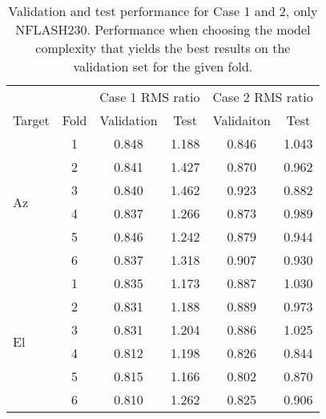 \begin{table}
    \centering
    \caption{Validation and test performance for Case 1 and 2, only NFLASH230.
    Performance when choosing the model complexity that yields the best results on the validation set for the given fold.}
    \begin{tabular}{lccccc}
        \toprule
        & & \multicolumn{2}{c}{Case 1 RMS ratio} & \multicolumn{2}{c}{Case 2 RMS ratio} \\
        \cmidrule{3-4} \cmidrule{5-6}
        Target & Fold & Validation & Test &  Validaiton &  Test \\
        \midrule
        \multirow{6}{*}{Az} & 1 &  0.848 &       1.188 &      0.846 &       1.043 \\
                            & 2 &  0.841 &       1.427 &      0.870 &       0.962 \\
                            & 3 &  0.840 &       1.462 &      0.923 &       0.882 \\
                            & 4 &  0.837 &       1.266 &      0.873 &       0.989 \\
                            & 5 &  0.846 &       1.242 &      0.879 &       0.944 \\
                            & 6 &  0.837 &       1.318 &      0.907 &       0.930 \\
        \hline
        \multirow{6}{*}{El} & 1 &  0.835 &       1.173 &      0.887 &       1.030 \\
                            & 2 &  0.831 &       1.188 &      0.889 &       0.973 \\
                            & 3 &  0.831 &       1.204 &      0.886 &       1.025 \\
                            & 4 &  0.812 &       1.198 &      0.826 &       0.844 \\
                            & 5 &  0.815 &       1.166 &      0.802 &       0.870 \\
                            & 6 &  0.810 &       1.262 &      0.825 &       0.906 \\
        \bottomrule
    \end{tabular}
    \label{tab:results_minval_val_test_days_04_n230}
\end{table}

